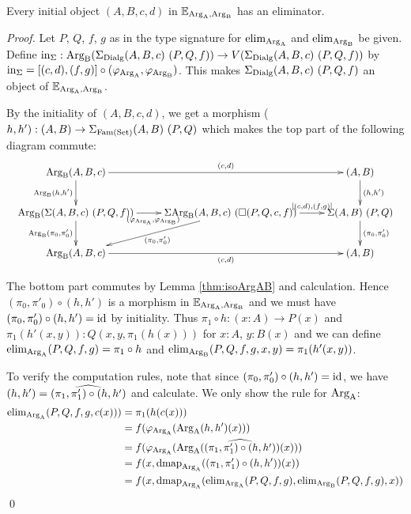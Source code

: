 \documentclass[orivec,envcountsame, ,envcountsect]{llncs}
\begin{document}
\begin{proposition}
\label{thm:init-to-elim}
Every initial object $(A, B, c, d)$ in $\mathbb{E}_{\text{Arg}_{\text{A}}, \text{Arg}_{\text{B}}}$ has an eliminator.
\end{proposition}
\begin{proof}
  Let $P$, $Q$, $f$, $g$ as in the type signature for $\text{elim}_{\text{Arg}_{\text{A}}}$
  and $\text{elim}_{\text{Arg}_{\text{B}}}$ be given. Define $\text{in}_{\Sigma} :
  \text{Arg}_{\text{B}}(\Sigma_{\text{Dialg}} (A, B, c)\ (P, Q, f)) \to V(\Sigma_{\text{Dialg}}
  (A, B, c)\ (P, Q, f))$ by $\text{in}_{\Sigma} = [(c, d), (f,
    g)] \circ (\varphi_{\text{Arg}_{\text{A}}}, \varphi_{\text{Arg}_{\text{B}}})$. This makes
  $\Sigma_{\text{Dialg}} (A, B, c)\ (P, Q, f)$ an object of
  $\mathbb{E}_{\text{Arg}_{\text{A}}, \text{Arg}_{\text{B}}}$.

  By the initiality of $(A, B, c, d)$, we get a morphism ($h, h') :
  (A, B) \to \Sigma_{\text{Fam}(\text{Set})} (A, B)\ (P, Q)$ which makes the top part of the
  following diagram commute:
\[
\resizebox{1\textwidth}{!}{%
\xymatrix{
\ArgB(A, B, c) \ar^-{(c, d)}[rr] \ar_-{\ArgB(h, h')}[d] & & (A, B) \ar^-{(h, h')}[d] \\
\ArgB(\Sigma (A, B, c)\ (P, Q, f)) \ar_{(\varphi_{\ArgA}, \varphi_{\ArgB})}[r] \ar_-{\ArgB(\pi_0, \pi'_0)}[d]
 & \Sigma \ArgB(A, B, c)\ (\BOX(P, Q, c, f))  \ar^-{\sigmamorph{(c,d)}{(f,g)}}[r] \ar^{(\pi_0, \pi'_0)}[dl]
 & \Sigma (A, B)\ (P, Q) \ar^-{(\pi_0, \pi'_0)}[d]\\
\ArgB(A, B, c) \ar_-{(c, d)}[rr] & & (A, B)
}
}
\]

The bottom part commutes by Lemma \ref{thm:isoArgAB} and
calculation. Hence $(\pi_0, \pi'_0) \circ (h, h')$ is a morphism in
$\mathbb{E}_{\text{Arg}_{\text{A}}, \text{Arg}_{\text{B}}}$ and we must have $(\pi_0, \pi'_0) \circ (h, h')
= \text{id}$ by initiality. Thus $\pi_1 \circ h : (x : A) \to P(x)$ and
$\pi_1(h'(x, y)) : Q(x, y, \pi_1(h(x)))$ for $x : A$, $y : B(x)$ and
we can define $\text{elim}_{\text{Arg}_{\text{A}}}(P, Q, f, g) = \pi_1 \circ h$ and
$\text{elim}_{\text{Arg}_{\text{B}}}(P, Q, f, g, x, y) = \pi_1(h'(x, y))$. 

To verify the computation rules, note that since $(\pi_0, \pi'_0)
\circ (h, h') = \text{id}$, we have $(h, h') = \widehat{(\pi_1, \pi'_1)
  \circ (h, h')}$ and calculate. We only show the rule for $\text{Arg}_{\text{A}}$:
\begin{align*}
  \text{elim}_{\text{Arg}_{\text{A}}}(P, Q, f, g, c(x)))
 &= \pi_1(h(c(x))) \\
 &= f(\varphi_{\text{Arg}_{\text{A}}}(\text{Arg}_{\text{A}}(h, h')(x))) \\
 &= f(\varphi_{\text{Arg}_{\text{A}}}(\text{Arg}_{\text{A}}(\widehat{(\pi_1, \pi'_1) \circ (h, h')})(x))) \\
 &= f(x, \text{dmap}_{\text{Arg}_{\text{A}}}((\pi_1, \pi'_1) \circ (h, h'))(x)) \\
 &= f(x, \text{dmap}_{\text{Arg}_{\text{A}}}(\text{elim}_{\text{Arg}_{\text{A}}}(P, Q, f, g), \text{elim}_{\text{Arg}_{\text{B}}}(P, Q, f, g), x))
\end{align*}
\mbox{} \qed %
\end{proof}
\end{document}
